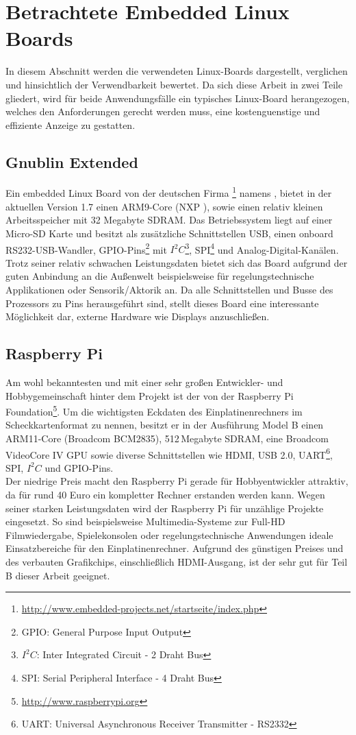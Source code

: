 \section{Betrachtete Embedded Linux Boards}
\label{cha:betrachtete_linux_boards}
In diesem Abschnitt werden die verwendeten Linux-Boards dargestellt, verglichen und hinsichtlich der Verwendbarkeit bewertet. Da sich diese Arbeit in zwei Teile gliedert, wird für beide Anwendungsfälle ein typisches Linux-Board herangezogen, welches den Anforderungen gerecht werden muss, eine kostenguenstige und effiziente Anzeige zu gestatten.
\subsection{Gnublin Extended}
\label{cha:gnublin_extended}
Ein embedded Linux Board von der deutschen Firma \footnote{\url{http://www.embedded-projects.net/startseite/index.php}} namens , bietet in der aktuellen Version 1.7 einen ARM9-Core (NXP ), sowie einen relativ kleinen Arbeitsspeicher mit 32 Megabyte SDRAM. Das Betriebssystem liegt auf einer Micro-SD Karte und besitzt als zusätzliche Schnittstellen USB, einen onboard RS232-USB-Wandler, GPIO-Pins\footnote{GPIO: General Purpose Input Output} mit $I^2C$\footnote{$I^2C$: Inter Integrated Circuit - 2 Draht Bus}, SPI\footnote{SPI: Serial Peripheral Interface - 4 Draht Bus} und Analog-Digital-Kanälen. Trotz seiner relativ schwachen Leistungsdaten bietet sich das Board aufgrund der guten Anbindung an die Außenwelt beispielsweise für regelungstechnische Applikationen oder Sensorik/Aktorik an.
Da alle Schnittstellen und Busse des Prozessors zu Pins herausgeführt sind, stellt dieses Board eine interessante Möglichkeit dar, externe Hardware wie Displays anzuschließen. 
\subsection{Raspberry Pi}
\label{cha:raspberry}
Am wohl bekanntesten und mit einer sehr großen Entwickler- und Hobbygemeinschaft hinter dem Projekt ist der  von der Raspberry Pi Foundation\footnote{\url{http://www.raspberrypi.org}}. Um die wichtigsten Eckdaten des Einplatinenrechners im Scheckkartenformat zu nennen, besitzt er in der Ausführung Model B einen ARM11-Core (Broadcom BCM2835), 512\,Megabyte SDRAM, eine Broadcom VideoCore IV GPU sowie diverse Schnittstellen wie HDMI, USB 2.0, UART\footnote{UART: Universal Asynchronous Receiver Transmitter - RS2332}, SPI, $I^2C$ und GPIO-Pins.\\
Der niedrige Preis macht den Raspberry Pi gerade für Hobbyentwickler attraktiv, da für rund 40 Euro ein kompletter Rechner erstanden werden kann. Wegen seiner starken Leistungsdaten wird der Raspberry Pi für unzählige Projekte eingesetzt. So sind beispielsweise Multimedia-Systeme zur Full-HD Filmwiedergabe, Spielekonsolen oder regelungstechnische Anwendungen ideale Einsatzbereiche für den Einplatinenrechner.
Aufgrund des günstigen Preises und des verbauten Grafikchips, einschließlich HDMI-Ausgang, ist der  sehr gut für Teil B dieser Arbeit geeignet.